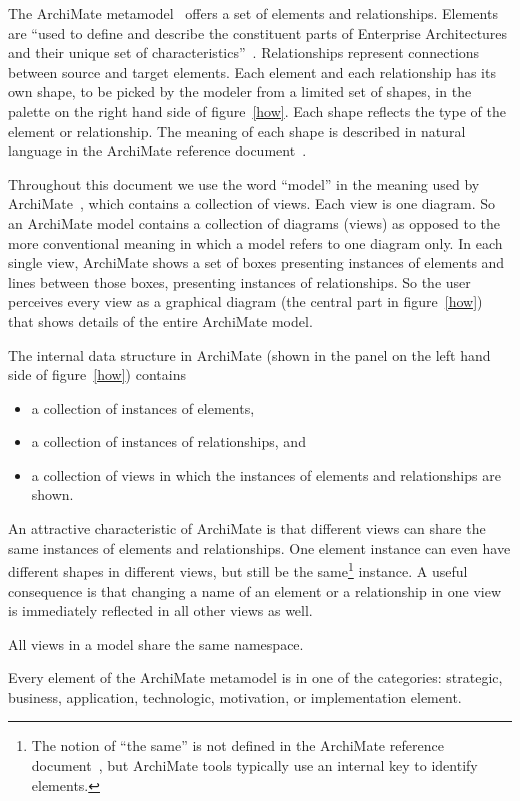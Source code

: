 \documentclass[sn-vancouver]{sn-jnl}%
\theoremstyle{thmstyleone}%
\theoremstyle{thmstyletwo}%
\theoremstyle{thmstylethree}%
\begin{document}
The ArchiMate metamodel~\cite{ArchiMateMetaModel} offers a set of elements and relationships.
Elements are ``used to define and describe the constituent parts of Enterprise Architectures and their unique set of characteristics''~\cite{ArchiMate}.
Relationships represent connections between source and target elements.
Each element and each relationship has its own shape, to be picked by the modeler from a limited set of shapes,
in the palette on the right hand side of figure~\ref{how}.
Each shape reflects the type of the element or relationship.
The meaning of each shape is described in natural language in the ArchiMate reference document~\cite{ArchiMate}.

Throughout this document we use the word ``model'' in the meaning used by ArchiMate~\cite{ArchiMate},
which contains a collection of views. Each view is one diagram.
So an ArchiMate model contains a collection of diagrams (views) as opposed to the more conventional meaning in which a model refers to one diagram only.
In each single view, ArchiMate shows a set of boxes presenting instances of elements and lines between those boxes, presenting instances of relationships.
So the user perceives every view as a graphical diagram (the central part in figure~\ref{how}) that shows details of the entire ArchiMate model.

The internal data structure in ArchiMate (shown in the panel on the left hand side of figure~\ref{how}) contains
\begin{itemize}
  \item a collection of instances of elements,
  \item a collection of instances of relationships, and
  \item a collection of views in which the instances of elements and relationships are shown.
\end{itemize}
An attractive characteristic of ArchiMate is that different views can share the same instances of elements and relationships.
One element instance can even have different shapes in different views,
but still be the same\footnote{The notion of ``the same'' is not defined in the ArchiMate reference document~\cite{ArchiMate},
but ArchiMate tools typically use an internal key to identify elements.} instance.
A useful consequence is that changing a name of an element or a relationship in one view is immediately reflected in all other views as well.

All views in a model share the same namespace.

Every element of the ArchiMate metamodel is in one of the categories: strategic, business, application, technologic, motivation, or implementation element.
\end{document}
